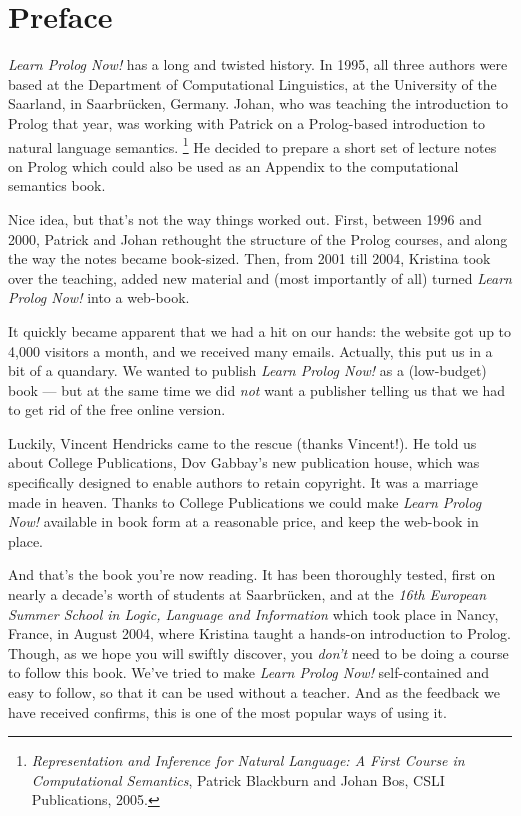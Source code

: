 
\chapter*{Preface}\label{PREFACE}

\textit{Learn Prolog Now!} has a long and twisted history.  In 1995,
all three authors were based at the Department of Computational
Linguistics, at the University of the Saarland, in Saarbr\"{u}cken,
Germany. Johan, who was teaching the introduction to Prolog that year,
was working with Patrick on a Prolog-based introduction to natural
language semantics.%
\footnote{\textit{Representation and Inference for Natural Language: A
First Course in Computational Semantics}, Patrick Blackburn and Johan
Bos, CSLI Publications, 2005.}
He decided to prepare a short set
of lecture notes on Prolog which could also be used as an Appendix to
the computational semantics book.

Nice idea, but that's not the way things worked out.  First, between
1996 and 2000, Patrick and Johan rethought the structure of the Prolog
courses, and along the way the notes became book-sized.  Then, from
2001 till 2004, Kristina took over the teaching, added new material
and (most importantly of all) turned \textit{Learn Prolog Now!}  into
a web-book.

It quickly became apparent that we had a hit on our hands: the website
got up to 4,000 visitors a month, and we received many
emails. Actually, this put us in a bit of a quandary. We wanted to
publish \textit{Learn Prolog Now!}  as a (low-budget) book --- but at
the same time we did \textit{not} want a publisher telling us that we
had to get rid of the free online version.

Luckily, Vincent Hendricks came to the rescue (thanks Vincent!).  He
told us about College Publications, Dov Gabbay's new publication
house, which was specifically designed to enable authors to retain
copyright. It was a marriage made in heaven.  Thanks to College
Publications we could make \textit{Learn Prolog Now!}  available in
book form at a reasonable price, and keep the web-book in place.

And that's the book you're now reading. It has been thoroughly tested,
first on nearly a decade's worth of students at Saarbr\"{u}cken, and
at the \textit{16th European Summer School in Logic, Language and
Information} which took place in Nancy, France, in August 2004, where
Kristina taught a hands-on introduction to Prolog. Though, as we hope
you will swiftly discover, you \textit{don't} need to be doing a
course to follow this book. We've tried to make \textit{Learn Prolog
Now!}  self-contained and easy to follow, so that it can be used
without a teacher. And as the feedback we have received confirms, this
is one of the most popular ways of using it.

